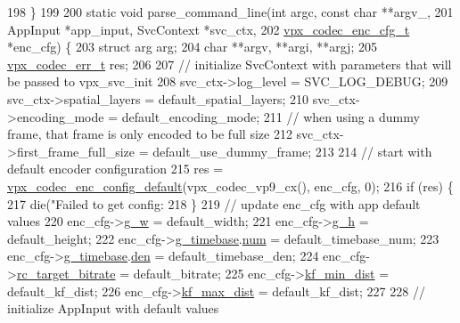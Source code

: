 \begin{DoxyCodeInclude}
{{{198 \}
199 
200 \textcolor{keyword}{static} \textcolor{keywordtype}{void} parse\_command\_line(\textcolor{keywordtype}{int} argc, \textcolor{keyword}{const} \textcolor{keywordtype}{char} **argv\_,
201                                AppInput *app\_input, SvcContext *svc\_ctx,
202                                \hyperlink{structvpx__codec__enc__cfg}{vpx\_codec\_enc\_cfg\_t} *enc\_cfg) \{
203   \textcolor{keyword}{struct }arg arg;
204   \textcolor{keywordtype}{char} **argv, **argi, **argj;
205   \hyperlink{group__codec_gada1084710837ad363b92f2379dd2b8d2}{vpx\_codec\_err\_t} res;
206 
207   \textcolor{comment}{// initialize SvcContext with parameters that will be passed to vpx\_svc\_init}
208   svc\_ctx->log\_level = SVC\_LOG\_DEBUG;
209   svc\_ctx->spatial\_layers = default\_spatial\_layers;
210   svc\_ctx->encoding\_mode = default\_encoding\_mode;
211   \textcolor{comment}{// when using a dummy frame, that frame is only encoded to be full size}
212   svc\_ctx->first\_frame\_full\_size = default\_use\_dummy\_frame;
213 
214   \textcolor{comment}{// start with default encoder configuration}
215   res = \hyperlink{group__encoder_ga9ab8c79623312e9c5d5405d66a788f59}{vpx\_codec\_enc\_config\_default}(vpx\_codec\_vp9\_cx(), enc\_cfg, 0);
216   \textcolor{keywordflow}{if} (res) \{
217     die(\textcolor{stringliteral}{"Failed to get config: %
218   \}
219   \textcolor{comment}{// update enc\_cfg with app default values}
220   enc\_cfg->\hyperlink{structvpx__codec__enc__cfg_a5c165f5b41ca1158f2883983a2b7709c}{g\_w} = default\_width;
221   enc\_cfg->\hyperlink{structvpx__codec__enc__cfg_a4132bd89ce85bce7c08f2cc3b6f2b82e}{g\_h} = default\_height;
222   enc\_cfg->\hyperlink{structvpx__codec__enc__cfg_a6498d378e4c29ef3e22258289e481087}{g\_timebase}.\hyperlink{structvpx__rational_ae7774f21a22c9bef3aa73156c79f4731}{num} = default\_timebase\_num;
223   enc\_cfg->\hyperlink{structvpx__codec__enc__cfg_a6498d378e4c29ef3e22258289e481087}{g\_timebase}.\hyperlink{structvpx__rational_a29dd2ab4001377b3aa21885ef969759f}{den} = default\_timebase\_den;
224   enc\_cfg->\hyperlink{structvpx__codec__enc__cfg_ab8339685175d66710f482706cc9f0aed}{rc\_target\_bitrate} = default\_bitrate;
225   enc\_cfg->\hyperlink{structvpx__codec__enc__cfg_a0a7b5444ecb09745cbe8d5af17553846}{kf\_min\_dist} = default\_kf\_dist;
226   enc\_cfg->\hyperlink{structvpx__codec__enc__cfg_ae018440136e271743376730413d25a9b}{kf\_max\_dist} = default\_kf\_dist;
227 
228   \textcolor{comment}{// initialize AppInput with default values}
}}}}
\end{DoxyCodeInclude}
